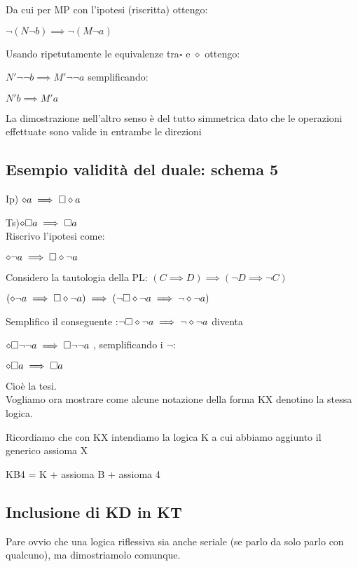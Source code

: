 Da cui per MP con l'ipotesi (riscritta) ottengo:

$\neg(N\neg b)\implies\neg(M\neg a)$

Usando ripetutamente le equivalenze tra$\square$ e $\diamond$ ottengo:

$N'\neg\neg b\implies M'\neg\neg a$ semplificando:

$N'b\implies M'a$

La dimostrazione nell'altro senso è del tutto simmetrica dato che
le operazioni effettuate sono valide in entrambe le direzioni


\subsection{Esempio validità del duale: schema 5}

Ip) $\diamond a\implies\square\diamond a$

Ts)$\diamond\square a\implies\square a$\\


Riscrivo l'ipotesi come:

$\diamond\neg a\implies\square\diamond\neg a$

Considero la tautologia della PL: $(C\implies D)\implies(\neg D\implies\neg C)$

$(\diamond\neg a\implies\square\diamond\neg a)\implies(\neg\square\diamond\neg a\implies\neg\diamond\neg a)$

Semplifico il conseguente :$\neg\square\diamond\neg a\implies\neg\diamond\neg a$
diventa

$\diamond\square\neg\neg a\implies\square\neg\neg a$ , semplificando
i $\neg$:

$\diamond\square a\implies\square a$

Cioè la tesi.\\


Vogliamo ora mostrare come alcune notazione della forma KX denotino
la stessa logica.

Ricordiamo che con KX intendiamo la logica K a cui abbiamo aggiunto
il generico assioma X

KB4 = K + assioma B + assioma 4


\subsection{Inclusione di KD in KT}

Pare ovvio che una logica riflessiva sia anche seriale (se parlo da
solo parlo con qualcuno), ma dimostriamolo comunque. \\


